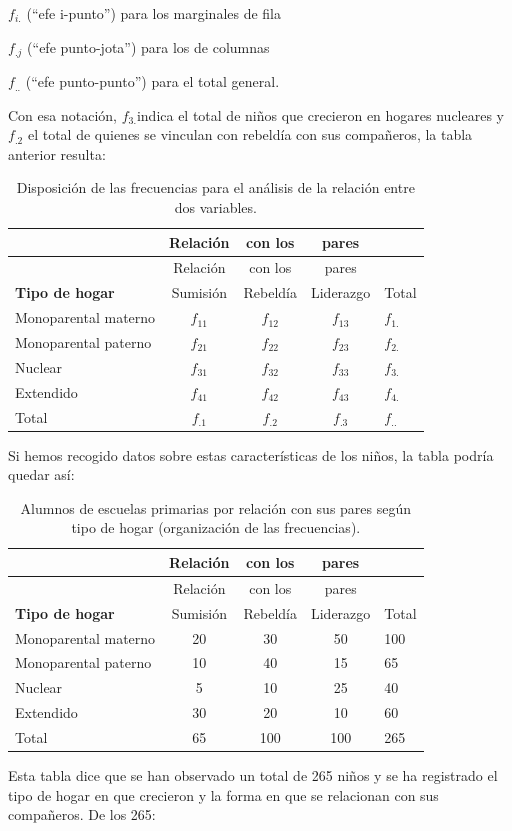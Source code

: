 \documentclass[]{book}
\begin{document}
\(f_{i.}\) (``efe i-punto'') para los marginales de fila

\(f_{.j}\) (``efe punto-jota'') para los de columnas

\(f_{..}\) (``efe punto-punto'') para el total general.

Con esa notación, \(f_{3.}\)indica el total de niños que crecieron en
hogares nucleares y \(f_{.2}\) el total de quienes se vinculan con rebeldía con sus compañeros, la tabla anterior resulta:

\begin{longtable}[]{@{}lcccl@{}}
\caption{\label{tab:unnamed-chunk-102}Disposición de las frecuencias para el análisis de la relación entre dos variables.}\tabularnewline
\toprule
& Relación & con los & pares &\tabularnewline
\midrule
\endfirsthead
\toprule
& Relación & con los & pares &\tabularnewline
\midrule
\endhead
\textbf{Tipo de hogar} & Sumisión & Rebeldía & Liderazgo & Total\tabularnewline
Monoparental materno & \(f_{11}\) & \(f_{12}\) & \(f_{13}\) & \(f_{1.}\)\tabularnewline
Monoparental paterno & \(f_{21}\) & \(f_{22}\) & \(f_{23}\) & \(f_{2.}\)\tabularnewline
Nuclear & \(f_{31}\) & \(f_{32}\) & \(f_{33}\) & \(f_{3.}\)\tabularnewline
Extendido & \(f_{41}\) & \(f_{42}\) & \(f_{43}\) & \(f_{4.}\)\tabularnewline
Total & \(f_{.1}\) & \(f_{.2}\) & \(f_{.3}\) & \(f_{..}\)\tabularnewline
\bottomrule
\end{longtable}

Si hemos recogido datos sobre estas características de los niños, la
tabla podría quedar así:

\begin{longtable}[]{@{}lcccl@{}}
\caption{\label{tab:unnamed-chunk-103}Alumnos de escuelas primarias por relación con sus pares según tipo de hogar (organización de las frecuencias).}\tabularnewline
\toprule
& Relación & con los & pares &\tabularnewline
\midrule
\endfirsthead
\toprule
& Relación & con los & pares &\tabularnewline
\midrule
\endhead
\textbf{Tipo de hogar} & Sumisión & Rebeldía & Liderazgo & Total\tabularnewline
Monoparental materno & 20 & 30 & 50 & 100\tabularnewline
Monoparental paterno & 10 & 40 & 15 & 65\tabularnewline
Nuclear & 5 & 10 & 25 & 40\tabularnewline
Extendido & 30 & 20 & 10 & 60\tabularnewline
Total & 65 & 100 & 100 & 265\tabularnewline
\bottomrule
\end{longtable}

Esta tabla dice que se han observado un total de 265 niños y se ha
registrado el tipo de hogar en que crecieron y la forma en que se
relacionan con sus compañeros. De los 265:
\end{document}
